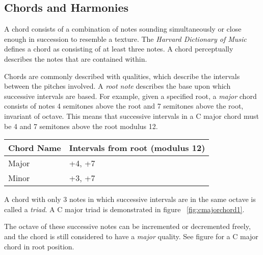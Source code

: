 \subsection{Chords and Harmonies}

A chord consists of a combination of notes sounding simultaneously or close enough in succession to resemble a texture. The \textit{Harvard Dictionary of Music} defines a chord as consisting of at least three notes\cite{harvdict}. A chord perceptually describes the notes that are contained within.

Chords are commonly described with qualities, which describe the intervals between the pitches involved. A \textit{root note} describes the base upon which successive intervals are based. For example, given a specified root, a \textit{major} chord consists of notes 4 semitones above the root and 7 semitones above the root, invariant of octave. This means that successive intervals in a C major chord must be 4 and 7 semitones above the root modulus 12.

\begin{table}[h]
\begin{tabular}{l|l}
Chord Name & Intervals from root (modulus 12) \\ \hline
Major      & +4, +7                           \\
Minor      & +3, +7                          
\end{tabular}
\end{table}

A chord with only 3 notes in which successive intervals are in the same octave is called a \textit{triad}. A C major triad is demonstrated in figure ~\ref{fig:cmajorchord1}.


The octave of these successive notes can be incremented or decremented freely, and the chord is still considered to have a \textit{major} quality. See figure for a C major chord in root position.

\begin{comment}
Chords feature a \textit{root note} which is the note around which the \textit{quality} is based.

The lowest note (note with the lowest pitch) within a \textit{root position} chord is called its \textit{root note}.

A chord typically has a root note, the note with the lowest pitch, and a quality, which describes the arrangement of successive notes' pitches.
\end{comment}